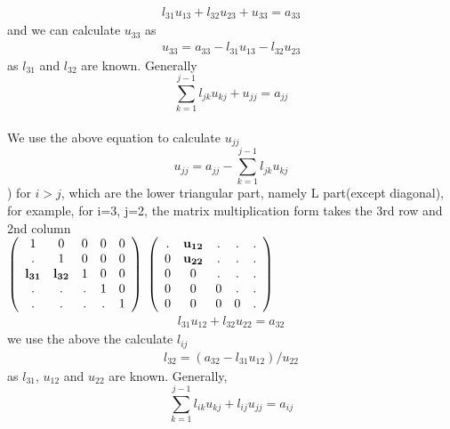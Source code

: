 \documentclass[a4paper]{article}
\begin{document}
\begin{align*}
	l_{31}u_{13} + l_{32}u_{23} + u_{33}= a_{33}
\end{align*}
and we can calculate $u_{33}$ as
\begin{align*}
	u_{33} = a_{33} - l_{31}u_{13} - l_{32}u_{23}
\end{align*}
as $l_{31}$ and $l_{32}$ are known.
Generally\\
\begin{equation}
	\sum_{k=1}^{j-1} l_{jk} u_{kj} + u_{jj} = a_{jj}	
\end{equation}
\\
We use the above equation to calculate $u_{jj}$\\
\begin{equation}
	u_{jj} = a_{jj} - \sum_{k=1}^{j-1} l_{jk} u_{kj}
\end{equation}
) for $i>j$, which are the lower triangular part, namely L part(except diagonal), for example, for i=3, j=2, the matrix multiplication form takes the 3rd row and 2nd column\\
$\left( \begin{array}{ccccc}
1      & 	0 	& 	0 	 & 	 0 		& 	0 	\\
. & 	1 	& 	0 	 &	 0 		& 	0	\\
{\bf l_{31}} & {\bf l_{32}} &   1  	 &   0		&	0	\\
. & . & . &   1 		& 	0	\\
. & . & . & . 	& 	1	\\\end{array} \right)$
$\left( \begin{array}{ccccc}
	. 	&  {\bf u_{12}}  & . & 	. & . 	\\
	0	&  {\bf u_{22}}  & .  &	. & .	\\
	0	& 	0	 &   .  & . &	.	\\
	0 	& 	0	 & 	 0		 &  . & 	.	\\
	0	& 	0	 & 	 0 		 &  0    & .	\\\end{array} \right)\\
$
\begin{align*}
	l_{31}u_{12} + l_{32}u_{22} = a_{32}
\end{align*}
we use the above the calculate $l_{ij}$
\begin{align*}
	l_{32} = (a_{32} - l_{31}u_{12})/u_{22}
\end{align*}
as $l_{31}$, $u_{12}$ and $u_{22}$ are known.
Generally,\\
\begin{equation}
	\sum_{k=1}^{j-1} l_{ik} u_{kj} + l_{ij}u_{jj} = a_{ij}	
\end{equation}
\end{document}
